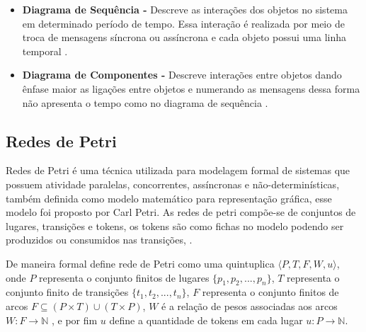 \begin{itemize}
        \item \textbf{Diagrama de Sequência -}
        Descreve as interações dos objetos no sistema em determinado período de tempo. Essa interação é realizada por meio de troca de mensagens síncrona ou assíncrona e cada objeto possui uma linha temporal \cite{uml}.
        
        \item \textbf{Diagrama de Componentes -}
        Descreve interações entre objetos dando ênfase maior as ligações entre objetos e numerando as mensagens dessa forma não apresenta o tempo como no diagrama de sequência \cite{uml}.

    \end{itemize}

    \subsection{Redes de Petri}
        Redes de Petri é uma técnica utilizada para modelagem formal de sistemas que possuem atividade paralelas, concorrentes, assíncronas e não-determinísticas, também definida como modelo matemático para representação gráfica, esse modelo foi proposto por Carl Petri\cite{cardoso1997redes}. As redes de petri compõe-se de conjuntos de lugares, transições e tokens, os tokens são como fichas no modelo podendo ser produzidos ou consumidos nas transições,  \cite{formalVerificationUML}.
        
        \par
        De maneira formal  define rede de Petri como uma quintuplica $\langle P,T,F,W,u\rangle$, onde $P$ representa o conjunto finitos de lugares $\{ p_1, p_2,..., p_n \}$, $T$ representa o conjunto finito de transições $\{t_1, t_2,..., t_n\}$, $F$ representa o conjunto finitos de arcos $F\subseteq (P \times T) \cup (T \times P)$, $W$ é a relação de pesos associadas aos arcos $W : F \rightarrow \mathbb{N}$ , e por fim $u$ define a quantidade de tokens em cada lugar $u : P \rightarrow \mathbb{N}$.
        
